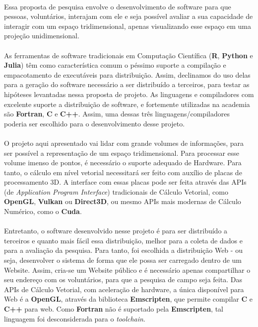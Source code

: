 \documentclass{article}
\begin{document}
	\paragraph{}
	Essa proposta de pesquisa envolve o desenvolvimento de software para que pessoas, voluntários, interajam com ele e seja possível avaliar a sua capacidade de interagir com um espaço tridimensional, apenas visualizando esse espaço em uma projeção unidimensional.
	
	\paragraph{}
	As ferramentas de software tradicionais em Computação Científica (\textbf{R}, \textbf{Python} e \textbf{Julia}) têm como característica comum o péssimo suporte a compilação e empacotamento de executáveis para distribuição. Assim, declinamos do uso delas para a geração do software necessário a ser distribuído a terceiros, para testar as hipóteses levantadas nessa proposta de projeto. As linguagens e compiladores com excelente suporte a distribuição de software, e fortemente utilizadas na academia são \textbf{Fortran}, \textbf{C} e \textbf{C++}. Assim, uma dessas três linguagens/compiladores poderia ser escolhido para o desenvolvimento desse projeto.
	
	\paragraph{}
	O projeto aqui apresentado vai lidar com grande volumes de informações, para ser possível a representação de um espaço tridimensional. Para processar esse volume imenso de pontos, é necessário o suporte adequado de Hardware. Para tanto, o cálculo em nível vetorial necessitará ser feito com auxílio de placas de processamento 3D. A interface com essas placas pode ser feita através das APIs (de \textit{Application Program Interface}) tradicionais de Cálculo Vetorial, como \textbf{OpenGL}, \textbf{Vulkan} ou \textbf{Direct3D}, ou mesmo APIs mais modernas de Cálculo Numérico, como o \textbf{Cuda}.
	
	\paragraph{}
	Entretanto, o software desenvolvido nesse projeto é para ser distribuído a terceiros e quanto mais fácil essa distribuição, melhor para a coleta de dados e para a avaliação da pesquisa. Para tanto, foi escolhida a distribuição Web - ou seja, desenvolver o sistema de forma que ele possa ser carregado dentro de um Website. Assim, cria-se um Website público e é necessário apenas compartilhar o seu endereço com os voluntários, para que a pesquisa de campo seja feita. Das APIs de Cálculo Vetorial, com aceleração de hardware, a única disponível para Web é a \textbf{OpenGL}, através da biblioteca \textbf{Emscripten}, que permite compilar \textbf{C} e \textbf{C++} para web. Como \textbf{Fortran} não é suportado pela \textbf{Emscripten}, tal linguagem foi desconsiderada para o \textit{toolchain}.
	
\end{document}

